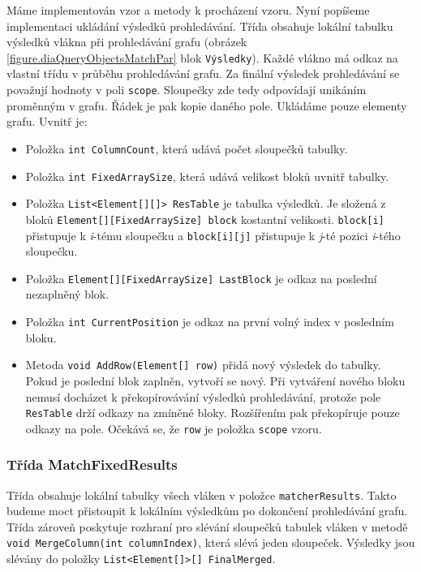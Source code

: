 Máme implementován vzor a metody k procházení vzoru.
Nyní popíšeme implementaci ukládání výsledků prohledávání.
Třída obsahuje lokální tabulku výsledků vlákna při prohledávání grafu (obrázek \ref{figure.diaQueryObjectsMatchPar} blok \texttt{Výsledky}). 
Každé vlákno má odkaz na vlastní třídu v průběhu prohledávání grafu.
Za finální výsledek prohledávání se považují hodnoty v poli \texttt{scope}.
Sloupečky zde tedy odpovídají unikáním proměnným v grafu.
Řádek je pak kopie daného pole.
Ukládáme pouze elementy grafu.
Uvnitř je:
\begin{itemize}
\item Položka \texttt{int ColumnCount}, která udává počet sloupečků tabulky. 
\item Položka \texttt{int FixedArraySize}, která udává velikost bloků uvnitř tabulky.
\item Položka \texttt{List<Element[][]> ResTable} je tabulka výsledků. 
Je složená z bloků \texttt{Element[][FixedArraySize] block} kostantní velikosti.
\texttt{block[i]} přistupuje k \textit{i}-tému sloupečku a \texttt{block[i][j]} přistupuje k \textit{j}-té pozici \textit{i}-tého sloupečku.
\item Položka \texttt{Element[][FixedArraySize] LastBlock} je odkaz na poslední nezaplněný blok.
\item Položka \texttt{int CurrentPosition} je odkaz na první volný index v posledním bloku.
\item Metoda \texttt{void AddRow(Element[] row)} přidá nový výsledek do tabulky.
Pokud je poslední blok zaplněn, vytvoří se nový.
Při vytváření nového bloku nemusí docházet k překopírovávání výsledků prohledávání, protože pole \texttt{ResTable} drží odkazy na zmíněné bloky.
Rozšířením pak překopíruje pouze odkazy na pole.
Očekává se, že \texttt{row} je položka \texttt{scope} vzoru. 

\end{itemize}

\subsubsection{Třída MatchFixedResults}

Třída obsahuje lokální tabulky všech vláken v položce \texttt{matcherResults}.
Takto budeme moct přistoupit k lokálním výsledkům po dokončení prohledávání grafu.
Třída zároveň poskytuje rozhraní pro slévání sloupečků tabulek vláken v metodě \texttt{void MergeColumn(int columnIndex)}, která slévá jeden sloupeček.
Výsledky jsou slévány do položky \texttt{List<Element[]>[] FinalMerged}.

